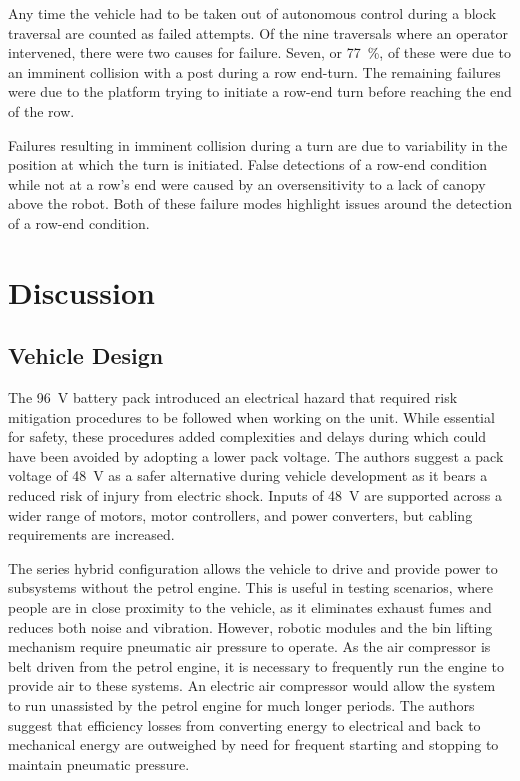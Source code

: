 \documentclass[preprint,authoryear,12pt]{elsarticle}
\begin{document}
    Any time the vehicle had to be taken out of autonomous control during a block traversal are counted as failed attempts.
    Of the nine traversals where an operator intervened, there were two causes for failure.
    Seven, or \SI{77}{\percent}, of these were due to an imminent collision with a post during a row end-turn.
    The remaining failures were due to the platform trying to initiate a row-end turn before reaching the end of the row.

    Failures resulting in imminent collision during a turn are due to variability in the position at which the turn is initiated.
    False detections of a row-end condition while not at a row's end were caused by an oversensitivity to a lack of canopy above the robot.
    Both of these failure modes highlight issues around the detection of a row-end condition.

\section{Discussion}
\label{sect:discussion}

    \subsection{Vehicle Design}
    \label{sub:design}
        The \SI{96}{\volt} battery pack introduced an electrical hazard that required risk mitigation procedures to be followed when working on the unit.
        While essential for safety, these procedures added complexities and delays during which could have been avoided by adopting a lower pack voltage.
        The authors suggest a pack voltage of \SI{48}{\volt} as a safer alternative during vehicle development as it bears a reduced risk of injury from electric shock.
        Inputs of \SI{48}{\volt} are supported across a wider range of motors, motor controllers, and power converters, but cabling requirements are increased.

        The series hybrid configuration allows the vehicle to drive and provide power to subsystems without the petrol engine.
        This is useful in testing scenarios, where people are in close proximity to the vehicle, as it eliminates exhaust fumes and reduces both noise and vibration.
        However, robotic modules and the bin lifting mechanism require pneumatic air pressure to operate.
        As the air compressor is belt driven from the petrol engine, it is necessary to frequently run the engine to provide air to these systems.
        An electric air compressor would allow the system to run unassisted by the petrol engine for much longer periods.
        The authors suggest that efficiency losses from converting energy to electrical and back to mechanical energy are outweighed by need for frequent starting and stopping to maintain pneumatic pressure.
\end{document}
